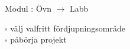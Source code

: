 
    Modul : Övn  $\rightarrow$ Labb 
    \begin{multicols}{3}\SlideFontTiny
    $\square$ välj valfritt fördjupningsområde \\
$\square$ påbörja projekt \\
    \end{multicols}
    